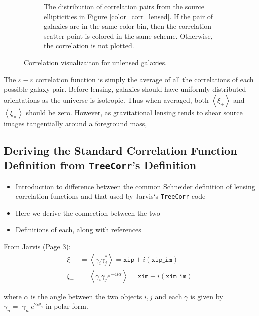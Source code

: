 \documentclass[%
 reprint,
 amsmath,amssymb,
 aps,nofootinbib
]{revtex4-1}
\begin{document}
\begin{figure}[b!]
\begin{subfigure}{0.45\textwidth}
        \captionsetup{justification=raggedright,singlelinecheck=false}
        \caption{The distribution of correlation pairs from the source ellipticities in Figure \ref{color_corr_lensed}. If the pair of galaxies are in the same color bin, then the correlation scatter point is colored in the same scheme. Otherwise, the correlation is not plotted.}
        \label{corr_dist_lensed}
    \end{subfigure}
    \caption{Correlation visualizaiton for unlensed galaxies.}
    \label{corr_colormaps}
\end{figure}

The $\varepsilon-\varepsilon$ correlation function is simply the average of all the correlations of each possible galaxy pair. Before lensing, galaxies should have uniformly distributed orientations as the universe is isotropic. Thus when averaged, both $\left<\xi_+\right>$ and $\left<\xi_\times\right>$ should be zero. However, as gravitational lensing tends to shear source images tangentially around a foreground mass,



\subsection{Deriving the Standard Correlation Function Definition from \texttt{TreeCorr}'s Definition}

\begin{itemize}
\item Introduction to difference between the common Schneider definition of lensing correlation functions and that used by Jarvis`s \texttt{TreeCorr} code
\item Here we derive the connection between the two
\item Definitions of each, along with references
\end{itemize}

From Jarvis \href{http://arxiv.org/pdf/astro-ph/0307393v2.pdf}{(Page 3)}:
\begin{align}
\xi_+&=\left<\gamma_i\gamma_j^*\right>=\texttt{xip}+i(\texttt{xip\_im})\label{s+}\\
\xi_-&=\left<\gamma_i\gamma_je^{-4i\alpha}\right>=\texttt{xim}+i(\texttt{xim\_im})\label{s-}
\end{align}

where $\alpha$ is the angle between the two objects $i,j$ and each $\gamma$ is given by $\gamma_n=|\gamma_n|e^{2i\theta_n}$ in polar form.\\
\end{document}
